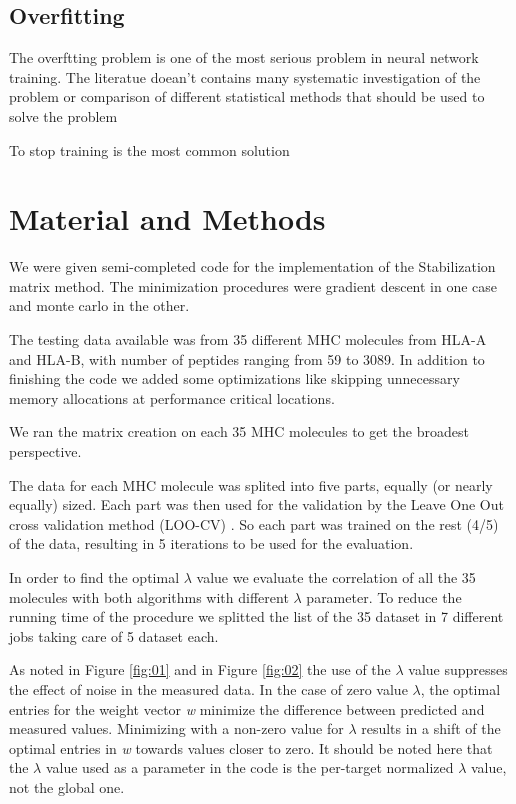 \documentclass{bioinfo}
\begin{document}
\begin{application}
\subsection*{Overfitting}
The overftting problem is one of the most serious problem in neural network training. 
The literatue doean't contains many systematic investigation of the problem or comparison of different statistical methods that should be used to solve the problem
\par To stop training is the most common solution


\section*{Material and Methods}

We were given semi-completed code for the implementation of the Stabilization matrix method. The minimization procedures were gradient descent in one case and monte carlo in the other. 
\par The testing data available was from 35 different MHC molecules from HLA-A and HLA-B, with number of peptides ranging from 59 to 3089. In addition to finishing the code we added some optimizations like skipping unnecessary memory allocations at performance critical locations. 
\par We ran the matrix creation on each 35 MHC molecules to get the broadest perspective.
\par The data for each MHC molecule was splited into five parts, equally (or nearly equally) sized. Each part was then used for the validation by the Leave One Out cross validation method (LOO-CV) \cite{wiki:crossval}. So each part was trained on the rest (4/5) of the data, resulting in 5 iterations to be used for the evaluation.
\par In order to find the optimal $\lambda$ value we evaluate the correlation of all the 35 molecules with both algorithms with different $\lambda$ parameter. To reduce the running time of the procedure we splitted the list of the 35 dataset in 7 different jobs taking care of 5 dataset each. 
\par As noted in Figure \ref{fig:01} and in Figure \ref{fig:02} the use of the $\lambda$ value suppresses the effect of noise in the measured data. In the case of zero value $\lambda$, the optimal entries for the weight vector \textit{w} minimize the difference between predicted and measured values.  Minimizing with a non-zero value for $\lambda$ results in a shift of the optimal entries in \textit{w} towards values closer to zero. It should be noted here that the $\lambda$ value used as a parameter in the code is the per-target normalized $\lambda$ value, not the global one.

\end{application}
\end{document}
